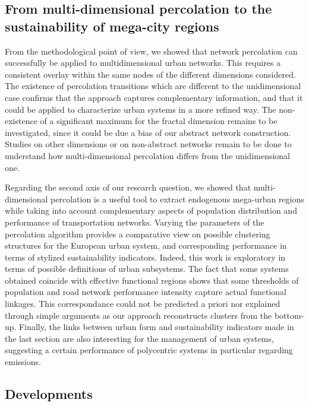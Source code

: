 \documentclass{jimis-en}
\begin{document}
\subsection{From multi-dimensional percolation to the sustainability of mega-city regions}

From the methodological point of view, we showed that network percolation can successfully be applied to multidimensional urban networks. This requires a consistent overlay within the same nodes of the different dimensions considered. The existence of percolation transitions which are different to the unidimensional case confirms that the approach captures complementary information, and that it could be applied to characterize urban systems in a more refined way. The non-existence of a significant maximum for the fractal dimension remains to be investigated, since it could be due a bias of our abstract network construction. Studies on other dimensions or on non-abstract networks remain to be done to understand how multi-dimensional percolation differs from the unidimensional one.


Regarding the second axis of our research question, we showed that multi-dimensional percolation is a useful tool to extract endogenous mega-urban regions while taking into account complementary aspects of population distribution and performance of transportation networks. Varying the parameters of the percolation algorithm provides a comparative view on possible clustering structures for the European urban system, and corresponding performance in terms of stylized sustainability indicators. Indeed, this work is exploratory in terms of possible definitions of urban subsystems. The fact that some systems obtained coincide with effective functional regions \citep{hall2006polycentric} shows that some thresholds of population and road network performance intensity capture actual functional linkages. This correspondance could not be predicted a priori nor explained through simple arguments as our approach reconstructs clusters from the bottom-up. Finally, the links between urban form and sustainability indicators made in the last section are also interesting for the management of urban systems, suggesting a certain performance of polycentric systems in particular regarding emissions.


\subsection{Developments}
\end{document}
